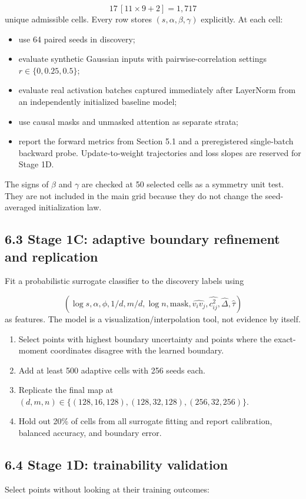 \documentclass[11pt,letterpaper]{article}
\theoremstyle{definition}
\begin{document}
\[
17\,[11\times9+2]=1{,}717
\]
unique admissible cells. Every row stores $(s,\alpha,\beta,\gamma)$ explicitly. At each cell:

\begin{itemize}
  \item use 64 paired seeds in discovery;
  \item evaluate synthetic Gaussian inputs with pairwise-correlation settings $r\in\{0,0.25,0.5\}$;
  \item evaluate real activation batches captured immediately after LayerNorm from an independently initialized baseline model;
  \item use causal masks and unmasked attention as separate strata;
  \item report the forward metrics from Section 5.1 and a preregistered single-batch backward probe. Update-to-weight trajectories and loss slopes are reserved for Stage 1D.
\end{itemize}
The signs of $\beta$ and $\gamma$ are checked at 50 selected cells as a symmetry unit test. They are not included in the main grid because they do not change the seed-averaged initialization law.

\subsection{6.3 Stage 1C: adaptive boundary refinement and replication}
Fit a probabilistic surrogate classifier to the discovery labels using

\[
(\log s,\alpha,\phi,1/d,m/d,\log n,\text{mask},
\widehat{v_iv_j},\widehat{c_{ij}^2},
\widehat\Delta,\widehat\tau)
\]
as features. The model is a visualization/interpolation tool, not evidence by itself.

\begin{enumerate}
  \item Select points with highest boundary uncertainty and points where the exact-moment coordinates disagree with the learned boundary.
  \item Add at least 500 adaptive cells with 256 seeds each.
  \item Replicate the final map at $(d,m,n)\in\{(128,16,128),(128,32,128),(256,32,256)\}$.
  \item Hold out 20\% of cells from all surrogate fitting and report calibration, balanced accuracy, and boundary error.
\end{enumerate}
\subsection{6.4 Stage 1D: trainability validation}
Select points without looking at their training outcomes:
\end{document}
